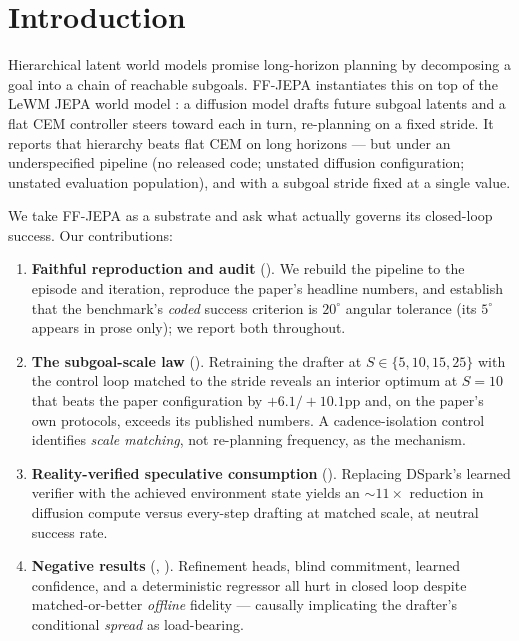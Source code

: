 \documentclass{article}
\newcommand{\degc}[1]{$#1^\circ$}
\begin{document}
\section{Introduction}
\label{sec:intro}

Hierarchical latent world models promise long-horizon planning by decomposing a goal
into a chain of reachable subgoals. FF-JEPA \citep{ffjepa} instantiates this on top of
the LeWM JEPA world model \citep{lewm}: a diffusion model drafts future subgoal latents
and a flat CEM controller \citep{cem} steers toward each in turn, re-planning on a fixed
stride. It reports that hierarchy beats flat CEM on long horizons --- but under an
underspecified pipeline (no released code; unstated diffusion configuration; unstated
evaluation population), and with a subgoal stride fixed at a single value.

We take FF-JEPA as a substrate and ask what actually governs its closed-loop success.
Our contributions:

\begin{enumerate}[itemsep=2pt,topsep=2pt]
\item \textbf{Faithful reproduction and audit} (). We rebuild the
pipeline to the episode and iteration, reproduce the paper's headline numbers, and
establish that the benchmark's \emph{coded} success criterion is \degc{20} angular
tolerance (its \degc{5} appears in prose only); we report both throughout.
\item \textbf{The subgoal-scale law} (). Retraining the drafter at
$S\in\{5,10,15,25\}$ with the control loop matched to the stride reveals an interior
optimum at $S{=}10$ that beats the paper configuration by $+6.1/+10.1$pp and, on the
paper's own protocols, exceeds its published numbers. A cadence-isolation control
identifies \emph{scale matching}, not re-planning frequency, as the mechanism.
\item \textbf{Reality-verified speculative consumption} (). Replacing
DSpark's learned verifier with the achieved environment state yields an
${\sim}11\times$ reduction in diffusion compute versus every-step drafting at matched
scale, at neutral success rate.
\item \textbf{Negative results} (, ). Refinement heads,
blind commitment, learned confidence, and a deterministic regressor all hurt in closed
loop despite matched-or-better \emph{offline} fidelity --- causally implicating the
drafter's conditional \emph{spread} as load-bearing.
\end{enumerate}
\end{document}
